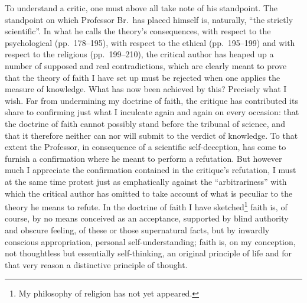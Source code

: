 \documentclass[12pt]{book}
\newcommand{\opage}[1]{\marginnote{\footnotesize\textit{[#1]}}}
\begin{document}
To understand a critic, one must above all take note of his standpoint. The
standpoint on which Professor Br.\ has placed himself is, naturally, ``the
strictly scientific''. In what he calls the theory's consequences, with
respect to the psychological (pp.\ 178--195), with respect to the ethical
(pp.\ 195--199) and with respect to the religious (pp.\ 199--210), the
critical author has heaped up a number of supposed and real
\opage{4}\setcounter{footnote}{0}%
contradictions, which are clearly meant to prove that the theory of faith I
have set up must be rejected when one applies the measure of knowledge. What
has now been achieved by this? Precisely what I wish. Far from undermining
my doctrine of faith, the critique has contributed its share to confirming
just what I inculcate again and again on every occasion: that the doctrine of
faith cannot possibly stand before the tribunal of science, and that it
therefore neither can nor will submit to the verdict of knowledge. To that
extent the Professor, in consequence of a scientific self-deception, has
come to furnish a confirmation where he meant to perform a refutation. But
however much I appreciate the confirmation contained in the critique's
refutation, I must at the same time protest just as emphatically against the
``arbitrariness'' with which the critical author has omitted to take account
of what is peculiar to the theory he means to refute. In the doctrine of
faith I have sketched\footnote{My philosophy of religion has not yet
appeared.} faith is, of course, by no means conceived as an acceptance, supported by
blind authority and obscure feeling, of these or those supernatural facts,
but by inwardly conscious appropriation, personal self-understanding; faith
is, on my conception, not thoughtless but essentially self-thinking, an
original principle of life and for that very reason a distinctive principle
of thought.
\end{document}
